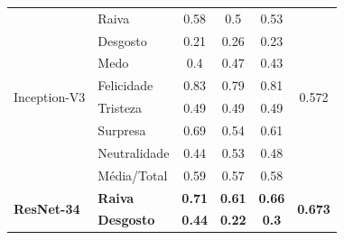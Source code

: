 \begin{table}[]
\begin{tabular}{llcccc}
\multirow{8}{*}{Inception-V3}     & Raiva                 & 0.58                                  & 0.5                                    & 0.53                                  & \multirow{8}{*}{0.572}                \\
                                       & Desgosto              & 0.21                                  & 0.26                                   & 0.23                                  &                                       \\
                                       & Medo                  & 0.4                                   & 0.47                                   & 0.43                                  &                                       \\
                                       & Felicidade            & 0.83                                  & 0.79                                   & 0.81                                  &                                       \\
                                       & Tristeza              & 0.49                                  & 0.49                                   & 0.49                                  &                                       \\
                                       & Surpresa              & 0.69                                  & 0.54                                   & 0.61                                  &                                       \\
                                       & Neutralidade          & 0.44                                  & 0.53                                   & 0.48                                  &                                       \\
                                       & Média/Total           & 0.59                                  & 0.57                                   & 0.58                                  &                                       \\ \hline
\multirow{8}{*}{\textbf{ResNet-34}} & \textbf{Raiva}        & \textbf{0.71}                         & \textbf{0.61}                          & \textbf{0.66}                         & \multirow{8}{*}{\textbf{0.673}}       \\
                                       & \textbf{Desgosto}     & \textbf{0.44}                         & \textbf{0.22}                          & \textbf{0.3}                          &                                       \\

\end{tabular}
\end{table}
